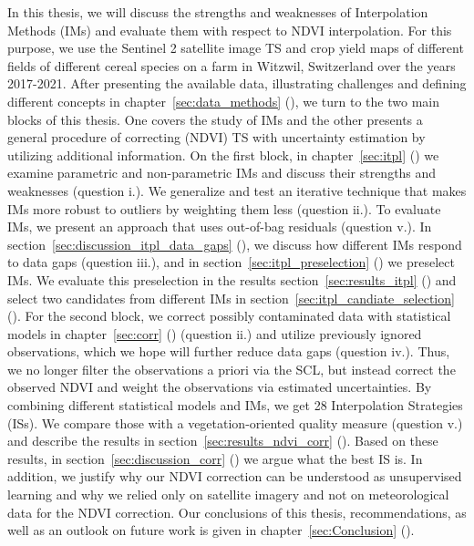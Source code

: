 In this thesis, we will discuss the strengths and weaknesses of Interpolation Methods ({{IM}}s) and evaluate them with respect to NDVI interpolation. For this purpose, we use the Sentinel 2 satellite image {TS} and crop yield maps of different fields of different cereal species on a farm in Witzwil, Switzerland over the years 2017-2021. After presenting the available data, illustrating challenges and defining different concepts in chapter~\ref{sec:data_methods} (), we turn to the two main blocks of this thesis. One covers the study of IMs and the other presents a general procedure of correcting (NDVI) TS with uncertainty estimation by utilizing additional information.
On the first block, in chapter~\ref{sec:itpl} () we examine parametric and non-parametric {{IM}}s and discuss their strengths and weaknesses (question i.). We generalize and test an iterative technique that makes IMs more robust to outliers by weighting them less (question ii.). To evaluate IMs, we present an approach that uses out-of-bag residuals (question v.). In section~\ref{sec:discussion_itpl_data_gaps} (), we discuss how different {{IM}}s respond to data gaps (question iii.), and in section~\ref{sec:itpl_preselection} () we preselect {{IM}}s. We evaluate this preselection in the results section~\ref{sec:results_itpl} () and select two candidates from different {{IM}}s in section~\ref{sec:itpl_candiate_selection} ().
For the second block, we correct possibly contaminated data with statistical models in chapter~\ref{sec:corr} () (question ii.) and utilize previously ignored observations, which we hope will further reduce data gaps (question iv.). Thus, we no longer filter the observations a priori via the SCL, but instead correct the observed NDVI and weight the observations via estimated uncertainties. By combining different statistical models and IMs, we get 28 Interpolation Strategies ({{ISs}}). We compare those with a vegetation-oriented quality measure (question v.) and describe the results in section~\ref{sec:results_ndvi_corr} (). Based on these results, in section~\ref{sec:discussion_corr} () we argue what the best {{IS}} is. In addition, we justify why our NDVI correction can be understood as unsupervised learning and why we relied only on satellite imagery and not on meteorological data for the NDVI correction.
Our conclusions of this thesis, recommendations, as well as an outlook on future work is given in chapter~\ref{sec:Conclusion} (). 








